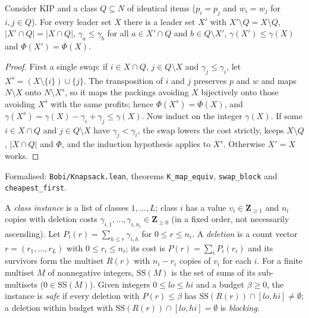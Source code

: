 \begin{lemma}\label{lem:kip-cheapest}
Consider KIP and a class $Q\subseteq N$ of identical items ($p_i=p_j$ and
$w_i=w_j$ for $i,j\in Q$). For every leader set $X$ there is a leader set $X'$
with $X'\setminus Q=X\setminus Q$, $|X'\cap Q|=|X\cap Q|$,
$\gamma_a\le\gamma_b$ for all $a\in X'\cap Q$ and $b\in Q\setminus X'$,
$\gamma(X')\le\gamma(X)$ and $\Phi(X')=\Phi(X)$.
\end{lemma}
\begin{proof}
First a single swap: if $i\in X\cap Q$, $j\in Q\setminus X$ and
$\gamma_j\le\gamma_i$, let $X^{s}=(X\setminus\{i\})\cup\{j\}$. The transposition of
$i$ and $j$ preserves $p$ and $w$ and maps $N\setminus X$ onto $N\setminus X^{s}$,
so it maps the packings avoiding $X$ bijectively onto those avoiding $X^{s}$
with the same profits; hence $\Phi(X^{s})=\Phi(X)$, and
$\gamma(X^{s})=\gamma(X)-\gamma_i+\gamma_j\le\gamma(X)$. Now induct on the integer
$\gamma(X)$. If some $i\in X\cap Q$ and $j\in Q\setminus X$ have $\gamma_j<\gamma_i$,
the swap lowers the cost strictly, keeps $X\setminus Q$, $|X\cap Q|$ and
$\Phi$, and the induction hypothesis applies to $X^{s}$. Otherwise $X'=X$
works.
\end{proof}
{\raggedright\noindent Formalised: \texttt{Bobi/Knapsack.lean}, theorems
\texttt{K\_map\_equiv}, \texttt{swap\_block} and \texttt{cheapest\_first}.\par}

\begin{definition}\label{def:class-instance}
A \emph{class instance} is a list of classes $1,\dots,L$; class $i$ has a
value $v_i\in\mathbf{Z}_{\ge 1}$ and $n_i$ copies with deletion costs
$\gamma_{i,1},\dots,\gamma_{i,n_i}\in\mathbf{Z}_{\ge 0}$ (in a fixed order, not
necessarily ascending). Let $P_i(r)=\sum_{h\le r}\gamma_{i,h}$ for
$0\le r\le n_i$. A \emph{deletion} is a count vector $r=(r_1,\dots,r_L)$ with
$0\le r_i\le n_i$; its cost is $P(r)=\sum_i P_i(r_i)$ and its survivors form
the multiset $R(r)$ with $n_i-r_i$ copies of $v_i$ for each $i$. For a finite
multiset $M$ of nonnegative integers, $\mathrm{SS}(M)$ is the set of sums of its
sub-multisets ($0\in\mathrm{SS}(M)$). Given integers $0\le lo\le hi$ and a
budget $\beta\ge 0$, the instance is \emph{safe} if every deletion with
$P(r)\le\beta$ has $\mathrm{SS}(R(r))\cap[lo,hi]\neq\emptyset$; a deletion within
budget with $\mathrm{SS}(R(r))\cap[lo,hi]=\emptyset$ is \emph{blocking}.
\end{definition}

